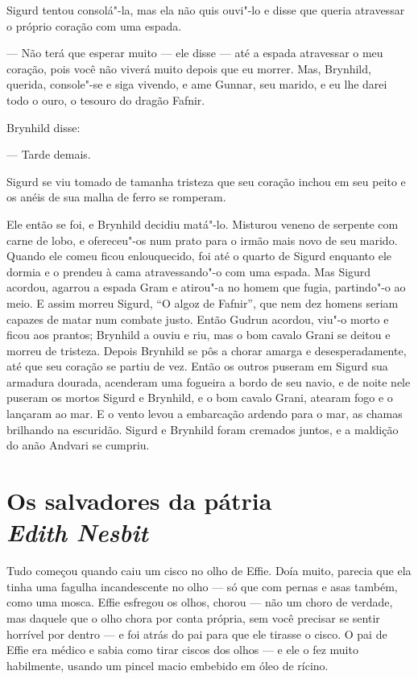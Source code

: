 Sigurd tentou consolá"-la, mas ela não quis ouvi"-lo e disse
que queria atravessar o próprio coração com uma espada. 

--- Não terá que esperar muito --- ele disse --- até a espada atravessar o
meu coração, pois você não viverá muito depois que eu morrer. Mas,
Brynhild, querida, console"-se e siga vivendo, e ame Gunnar, seu
marido, e eu lhe darei todo o ouro, o tesouro do dragão Fafnir. 

Brynhild disse:

--- Tarde demais.

Sigurd se viu tomado de tamanha tristeza que seu coração inchou em seu
peito e os anéis de sua malha de ferro se romperam.

Ele então se foi, e Brynhild decidiu matá"-lo. Misturou veneno de
serpente com carne de lobo, e ofereceu"-os num prato para o irmão mais
novo de seu marido. Quando ele comeu ficou enlouquecido, foi até o
quarto de Sigurd enquanto ele dormia e o prendeu à cama
atravessando"-o com uma espada. Mas Sigurd acordou, agarrou a espada
Gram e atirou"-a no homem que fugia, partindo"-o ao meio. E assim
morreu Sigurd, ``O algoz de Fafnir'', que nem dez homens seriam capazes
de matar num combate justo. Então Gudrun acordou, viu"-o morto e ficou
aos prantos; Brynhild a ouviu e riu, mas o bom cavalo Grani se deitou
e morreu de tristeza. Depois Brynhild se pôs a chorar amarga e
desesperadamente, até que seu coração se partiu de vez. Então os
outros puseram em Sigurd sua armadura dourada, acenderam uma fogueira
a bordo de seu navio, e de noite nele puseram os mortos Sigurd e
Brynhild, e o bom cavalo Grani, atearam fogo e o lançaram ao mar. E
o vento levou a embarcação ardendo para o mar, as chamas brilhando na escuridão.
Sigurd e Brynhild foram cremados juntos, e a maldição do anão Andvari
se cumpriu. 

\chapter[Os salvadores da pátria\\{\itshape Edith Nesbit}]{Os salvadores da pátria\\{\LARGE\itshape Edith Nesbit}}

Tudo começou quando caiu um cisco no olho de Effie. Doía muito,
parecia que ela tinha uma fagulha incandescente no olho --- só que
com pernas e asas também, como uma mosca. Effie esfregou os
olhos, chorou --- não um choro de verdade, mas daquele que o olho
chora por conta própria, sem você precisar se sentir horrível por
dentro --- e foi atrás do pai para que ele tirasse o
cisco. O pai de Effie era médico e sabia
como tirar ciscos dos olhos --- e ele o fez muito habilmente, usando um
pincel macio embebido em óleo de rícino.

